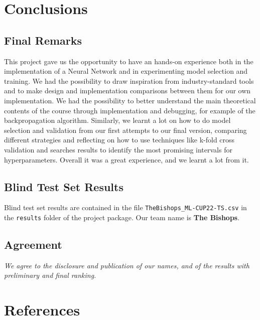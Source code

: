 \section{Conclusions}

\subsection{Final Remarks}
This project gave us the opportunity to have an hands-on experience both in the implementation of a Neural Network and in experimenting model selection and training. We had the possibility to draw inspiration from industry-standard tools and to make design and implementation comparisons between them for our own implementation. We had the possibility to better understand the main theoretical contents of the course through implementation and debugging, for example of the backpropagation algorithm. Similarly, we learnt a lot on how to do model selection and validation from our first attempts to our final version, comparing different strategies and reflecting on how to use techniques like k-fold cross validation and searches results to identify the most promising intervals for hyperparameters. Overall it was a great experience, and we learnt a lot from it.

\subsection{Blind Test Set Results}
Blind test set results are contained in the file \texttt{TheBishops\_ML-CUP22-TS.csv} in the \texttt{results} folder of the project package. Our team name is \textbf{The Bishops}.

\subsection{Agreement}
\noindent\textit{We agree to the disclosure and publication of our names, and of the results with preliminary and final ranking.}

\section*{References}


\vspace{-1cm}

